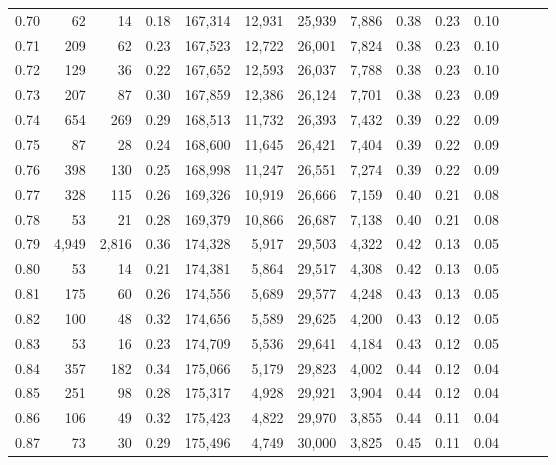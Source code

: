 \begin{tabular}{rrrrrrrrrrrrrr}
0.70 &      62 &     14 &  0.18 &  167,314 &   12,931 &  25,939 &   7,886 &  0.38 &  0.23 &      0.10 \\
0.71 &     209 &     62 &  0.23 &  167,523 &   12,722 &  26,001 &   7,824 &  0.38 &  0.23 &      0.10 \\
0.72 &     129 &     36 &  0.22 &  167,652 &   12,593 &  26,037 &   7,788 &  0.38 &  0.23 &      0.10 \\
0.73 &     207 &     87 &  0.30 &  167,859 &   12,386 &  26,124 &   7,701 &  0.38 &  0.23 &      0.09 \\
0.74 &     654 &    269 &  0.29 &  168,513 &   11,732 &  26,393 &   7,432 &  0.39 &  0.22 &      0.09 \\
0.75 &      87 &     28 &  0.24 &  168,600 &   11,645 &  26,421 &   7,404 &  0.39 &  0.22 &      0.09 \\
0.76 &     398 &    130 &  0.25 &  168,998 &   11,247 &  26,551 &   7,274 &  0.39 &  0.22 &      0.09 \\
0.77 &     328 &    115 &  0.26 &  169,326 &   10,919 &  26,666 &   7,159 &  0.40 &  0.21 &      0.08 \\
0.78 &      53 &     21 &  0.28 &  169,379 &   10,866 &  26,687 &   7,138 &  0.40 &  0.21 &      0.08 \\
0.79 &   4,949 &  2,816 &  0.36 &  174,328 &    5,917 &  29,503 &   4,322 &  0.42 &  0.13 &      0.05 \\
0.80 &      53 &     14 &  0.21 &  174,381 &    5,864 &  29,517 &   4,308 &  0.42 &  0.13 &      0.05 \\
0.81 &     175 &     60 &  0.26 &  174,556 &    5,689 &  29,577 &   4,248 &  0.43 &  0.13 &      0.05 \\
0.82 &     100 &     48 &  0.32 &  174,656 &    5,589 &  29,625 &   4,200 &  0.43 &  0.12 &      0.05 \\
0.83 &      53 &     16 &  0.23 &  174,709 &    5,536 &  29,641 &   4,184 &  0.43 &  0.12 &      0.05 \\
0.84 &     357 &    182 &  0.34 &  175,066 &    5,179 &  29,823 &   4,002 &  0.44 &  0.12 &      0.04 \\
0.85 &     251 &     98 &  0.28 &  175,317 &    4,928 &  29,921 &   3,904 &  0.44 &  0.12 &      0.04 \\
0.86 &     106 &     49 &  0.32 &  175,423 &    4,822 &  29,970 &   3,855 &  0.44 &  0.11 &      0.04 \\
0.87 &      73 &     30 &  0.29 &  175,496 &    4,749 &  30,000 &   3,825 &  0.45 &  0.11 &      0.04 \\

\end{tabular}
